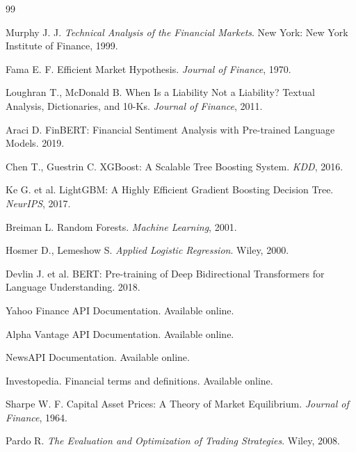 \documentclass[12pt,a4paper]{article}
\begin{document}
\begin{thebibliography}{99}

Murphy J. J. \textit{Technical Analysis of the Financial Markets}. New York: New York Institute of Finance, 1999.

Fama E. F. Efficient Market Hypothesis. \textit{Journal of Finance}, 1970.

Loughran T., McDonald B. When Is a Liability Not a Liability? Textual Analysis, Dictionaries, and 10-Ks. \textit{Journal of Finance}, 2011.

Araci D. FinBERT: Financial Sentiment Analysis with Pre-trained Language Models. 2019.

Chen T., Guestrin C. XGBoost: A Scalable Tree Boosting System. \textit{KDD}, 2016.

Ke G. et al. LightGBM: A Highly Efficient Gradient Boosting Decision Tree. \textit{NeurIPS}, 2017.

Breiman L. Random Forests. \textit{Machine Learning}, 2001.

Hosmer D., Lemeshow S. \textit{Applied Logistic Regression}. Wiley, 2000.

Devlin J. et al. BERT: Pre-training of Deep Bidirectional Transformers for Language Understanding. 2018.

Yahoo Finance API Documentation. Available online.

Alpha Vantage API Documentation. Available online.

NewsAPI Documentation. Available online.

Investopedia. Financial terms and definitions. Available online.

Sharpe W. F. Capital Asset Prices: A Theory of Market Equilibrium. \textit{Journal of Finance}, 1964.

Pardo R. \textit{The Evaluation and Optimization of Trading Strategies}. Wiley, 2008.

\end{thebibliography}
\end{document}
